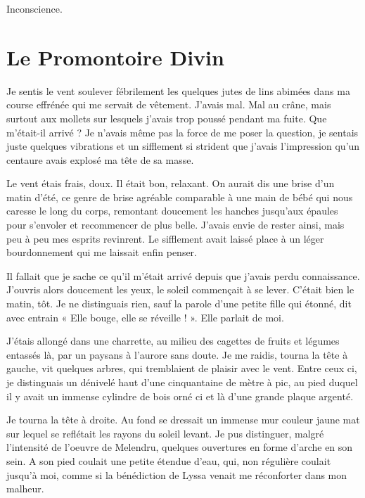 \documentclass{book}
\begin{document}
Inconscience.

\chapter{Le Promontoire Divin}
Je sentis le vent soulever fébrilement les quelques jutes de lins abimées dans ma course effrénée qui me servait de vêtement. J'avais mal. Mal au crâne, mais surtout aux mollets sur lesquels j'avais trop poussé pendant ma fuite. Que m'était-il arrivé ? Je n'avais même pas la force de me poser la question, je sentais juste quelques vibrations et un sifflement si strident que j'avais l'impression qu'un centaure avais explosé ma tête de sa masse.\newline

Le vent étais frais, doux. Il était bon, relaxant. On aurait dis une brise d'un matin d'été, ce genre de brise agréable comparable à une main de bébé qui nous caresse le long du corps, remontant doucement les hanches jusqu'aux épaules pour s'envoler et recommencer de plus belle. J'avais envie de rester ainsi, mais peu à peu mes esprits revinrent. Le sifflement avait laissé place à un léger bourdonnement qui me laissait enfin penser.\newline

Il fallait que je sache ce qu'il m'était arrivé depuis que j'avais perdu connaissance. J'ouvris alors doucement les yeux, le soleil commençait à se lever. C'était bien le matin, tôt. Je ne distinguais rien, sauf la parole d'une petite fille qui étonné, dit avec entrain « Elle bouge, elle se réveille ! ». Elle parlait de moi.\newline

J'étais allongé dans une charrette, au milieu des cagettes de fruits et légumes entassés là, par un paysans à l'aurore sans doute. Je me raidis, tourna la tête à gauche, vit quelques arbres, qui tremblaient de plaisir avec le vent. Entre ceux ci, je distinguais un dénivelé haut d'une cinquantaine de mètre à pic, au pied duquel il y avait un immense cylindre de bois orné ci et là d'une grande plaque argenté.\newline

Je tourna la tête à droite. Au fond se dressait un immense mur couleur jaune mat sur lequel se reflétait les rayons du soleil levant. Je pus distinguer, malgré l'intensité de l'oeuvre de Melendru, quelques ouvertures en forme d'arche en son sein. A son pied coulait une petite étendue d'eau, qui, non régulière coulait jusqu'à moi, comme si la bénédiction de Lyssa venait me réconforter dans mon malheur.\newline
\end{document}
